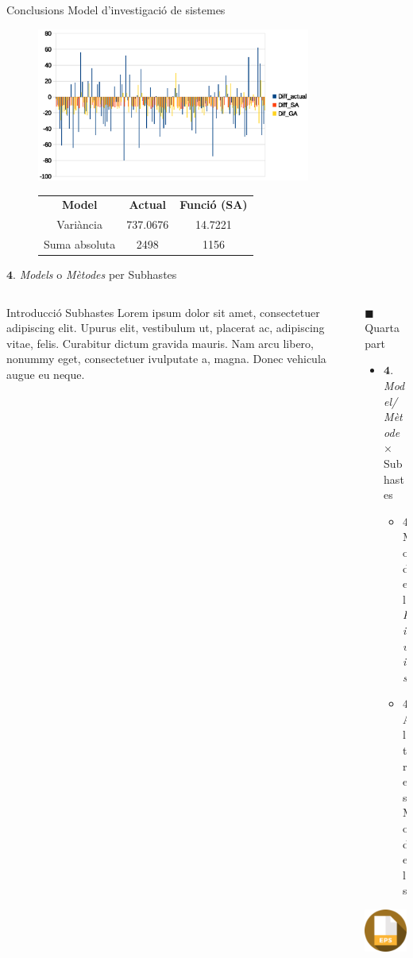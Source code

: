 \documentclass[twocolumn]{beamer}
\begin{document}
\begin{frame}{Conclusions Model d'investigació de sistemes}
\begin{figure}
\includegraphics[width=9cm]{saldo_diff_ga}
\begin{tabular}{c|c|c}
	\textbf{Model} & \textbf{Actual} & \textbf{Funció (SA)} \\
	Variància & 737.0676 & 14.7221 \\
	Suma absoluta & 2498 & 1156 \\
\end{tabular}
\end{figure}
\end{frame}
\begin{frame}{$\mathbf 4.$ \textit{Models} o \textit{Mètodes} per Subhastes}
\begin{columns}[t]
	\begin{column}{.5\textwidth}
		\begin{block}{Introducció Subhastes}
			Lorem ipsum dolor sit amet,
			consectetuer adipiscing elit. Upurus elit, vestibulum ut,
			placerat ac, adipiscing vitae,
			felis. Curabitur dictum gravida
			mauris. Nam arcu libero,
			nonummy eget, consectetuer ivulputate a, magna. Donec
			vehicula augue eu neque.
		\end{block}
	\end{column}
	\begin{column}{.5\textwidth}
	\begin{block}{$\blacksquare$ Quarta part}
		\begin{itemize}
			\small
			\item $\mathbf{4.}$ \textit{Model/Mètode} $\times$ Subhastes
			\begin{itemize}
				\footnotesize
				\item $\mathbf{4.2}$ Model \textit{Kiwis}
				\item $\mathbf{4.3}$ Altres Models 
			\end{itemize}
		\end{itemize}
	\end{block}
		\includegraphics[width=3.5cm]{eps}
	\end{column}
\end{columns}
\end{frame}
\end{document}

